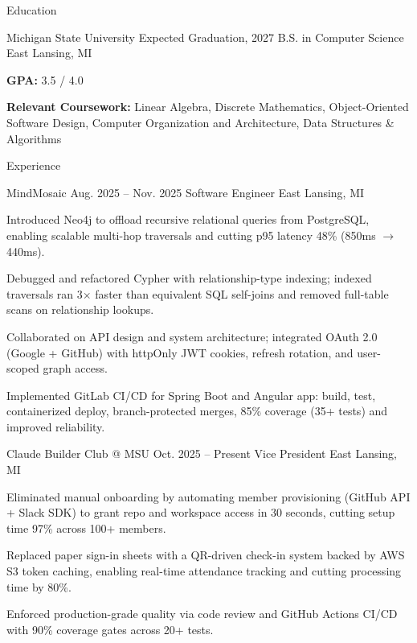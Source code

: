 \documentclass[
	11pt
]{../../../resume}
\begin{document}
	\begin{rSection}{E}{ducation}
		\begin{rSectionEntry}
			{Michigan State University}
			{Expected Graduation, 2027}
			{B.S. in Computer Science}
			{}
			{East Lansing, MI}

			\item \textbf{GPA:} 3.5 / 4.0
			\item \textbf{Relevant Coursework:} Linear Algebra, Discrete Mathematics, Object-Oriented Software Design, Computer Organization and Architecture, Data Structures \& Algorithms
		\end{rSectionEntry}
	\end{rSection}

	\begin{rSection}{E}{xperience}
		\begin{rSectionEntry}
			{MindMosaic}
			{Aug. 2025 -- Nov. 2025}
			{Software Engineer}
			{}
			{East Lansing, MI}

			\item Introduced Neo4j to offload recursive relational queries from PostgreSQL, enabling scalable multi-hop traversals and cutting p95 latency 48\% (850ms $\rightarrow$ 440ms).
			\item Debugged and refactored Cypher with relationship-type indexing; indexed traversals ran 3$\times$ faster than equivalent SQL self-joins and removed full-table scans on relationship lookups.
			\item Collaborated on API design and system architecture; integrated OAuth 2.0 (Google + GitHub) with httpOnly JWT cookies, refresh rotation, and user-scoped graph access.
			\item Implemented GitLab CI/CD for Spring Boot and Angular app: build, test, containerized deploy, branch-protected merges, 85\% coverage (35+ tests) and improved reliability.
		\end{rSectionEntry}

		\begin{rSectionEntry}
			{Claude Builder Club @ MSU}
			{Oct. 2025 -- Present}
			{Vice President}
			{}
			{East Lansing, MI}

			\item Eliminated manual onboarding by automating member provisioning (GitHub API + Slack SDK) to grant repo and workspace access in 30 seconds, cutting setup time 97\% across 100+ members.
			\item Replaced paper sign-in sheets with a QR-driven check-in system backed by AWS S3 token caching, enabling real-time attendance tracking and cutting processing time by 80\%.
			\item Enforced production-grade quality via code review and GitHub Actions CI/CD with 90\% coverage gates across 20+ tests.
		\end{rSectionEntry}
	\end{rSection}
\end{document}
